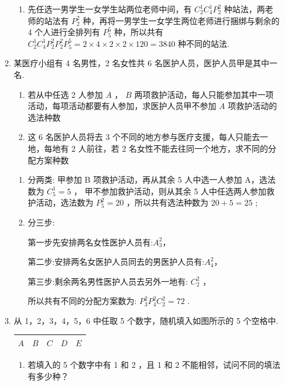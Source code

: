 \begin{enumerate}
\begin{enumerate}
\begin{jieda}
\begin{enumerate}
                \item 先任选一男学生一女学生站两位老师中间，有 ${{C}}_{2}^{1}{{C}}_{4}^{1}P_{2}^{2}$ 种站法，两老师的站法有 $P_{2}^{2}$ 种，再将一男学生一女学生两位老师进行捆绑与剩余的 4 个人进行全排列有 $P_{5}^{5}$ 种，所以共有 ${{C}}_{2}^{1}{{C}}_{4}^{1}P_{2}^{2}P_{2}^{2}P_{5}^{5} = 2 \times  4 \times  2 \times  2 \times  {120} = {3840}$ 种不同的站法.
            \end{enumerate}
        \end{jieda}
        \item 某医疗小组有 4 名男性，2 名女性共 6 名医护人员，医护人员甲是其中一名.
        \begin{enumerate}
            \item 若从中任选 2 人参加 $A$ ， $B$ 两项救护活动，每人只能参加其中一项活动，每项活动都要有人参加，求医护人员甲不参加 $A$ 项救护活动的选法种数
            \item 这 6 名医护人员将去 3 个不同的地方参与医疗支援，每人只能去一地，每地有 2 人前往，若 2 名女性不能去往同一个地方，求不同的分配方案种数
        \end{enumerate}
        \begin{jieda}
            \begin{enumerate}
                \item 分两类:  甲参加 B 项救护活动，再从其余 5 人中选一人参加 A，选法数为 ${{C}}_{5}^{1} = 5$ ，   甲不参加救护活动，则从其余 5 人中任选两人参加救护活动，选法数为 $P_{5}^{2} = {20}$ ，所以共有选法种数为 ${20} + 5 = {25}$ ;
                
                \item 分三步:
                
                第一步先安排两名女性医护人员有:$A_3^2$，
                
                第二步:安排两名女医护人员同去的男医护人员有:$A_4^2$，
                
                第三步:剩余两名男性医护人员去另外一地有: $C_{2}^{2}$ ，
                
                所以共有不同的分配方案数为: $P_{3}^{2}P_{4}^{2}{{C}}_{2}^{2} = {72}$ .
            \end{enumerate}
        \end{jieda}
        
        \item 从 1，2，3，4，5，6 中任取 5 个数字，随机填入如图所示的 5 个空格中.
        
        \begin{center}
        \begin{tabular}{|c|c|c|c|c|}
        \hline
        $A$ & $B$ & $C$ & $D$ & $E$ \\
        \cline{1-5}
        \hline
        \end{tabular}
        \end{center}
        \begin{enumerate}
            \item 若填入的 5 个数字中有 1 和 2 ，且 1 和 2 不能相邻，试问不同的填法有多少种？
            

\end{enumerate}
\end{enumerate}
\end{enumerate}
